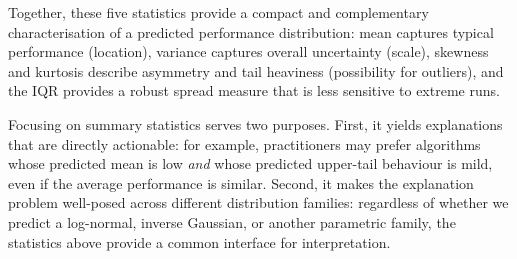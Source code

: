 









Together, these five statistics provide a compact and complementary characterisation of a predicted performance distribution: mean captures typical performance (location), variance captures overall uncertainty (scale), skewness and kurtosis describe asymmetry and tail heaviness (possibility for outliers), and the IQR provides a robust spread measure that is less sensitive to extreme runs. 

Focusing on summary statistics serves two purposes. First, it yields explanations that are directly actionable: for example, practitioners may prefer algorithms whose predicted mean is low \emph{and} whose predicted upper-tail behaviour is mild, even if the average performance is similar. Second, it makes the explanation problem well-posed across different distribution families: regardless of whether we predict a log-normal, inverse Gaussian, or another parametric family, the statistics above provide a common interface for interpretation.

